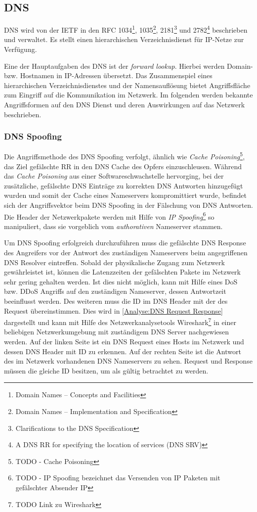 \subsection{\ac{DNS}}
\label{Analyse:DNS}
\ac{DNS} wird von der \ac{IETF} in den \ac{RFC} 1034\footnote{Domain Names – Concepts and Facilities}, 1035\footnote{Domain Names – Implementation and Specification}, 2181\footnote{Clarifications to the DNS Specification} und 2782\footnote{A DNS RR for specifying the location of services (DNS SRV)} beschrieben und verwaltet. Es stellt einen hierarchischen Verzeichnisdienst für \ac{IP}-Netze zur Verfügung. 

Eine der Hauptaufgaben des \ac{DNS} ist der \textit{forward lookup}. Hierbei werden Domain- bzw. Hostnamen in \ac{IP}-Adressen übersetzt. Das Zusammenspiel eines hierarchischen Verzeichnisdienstes und der Namensauflösung bietet Angriffsfläche zum Eingriff auf die Kommunikation im Netzwerk. Im folgenden werden bekannte Angriffsformen auf den \ac{DNS} Dienst und deren Auswirkungen auf das Netzwerk beschrieben.

\subsubsection{\ac{DNS} Spoofing}
Die Angriffsmethode des \ac{DNS} Spoofing verfolgt, ähnlich wie \textit{Cache Poisoning}\footnote{TODO - Cache Poisoning}, das Ziel gefälschte \ac{RR} in den \ac{DNS} Cache des Opfers einzuschleusen. Während das \textit{Cache Poisoning} aus einer Softwareschwachstelle hervorging, bei der zusätzliche, gefälschte \ac{DNS} Einträge zu korrekten \ac{DNS} Antworten hinzugefügt wurden und somit der Cache eines Nameservers kompromittiert wurde, befindet sich der Angriffsvektor beim \ac{DNS} Spoofing in der Fälschung von \ac{DNS} Antworten. Die Header der Netzwerkpakete werden mit Hilfe von \textit{IP Spoofing}\footnote{TODO - IP Spoofing bezeichnet das Versenden von IP Paketen mit gefälschter Absender IP} so manipuliert, dass sie vorgeblich vom \textit{authorativen} Nameserver stammen. 

Um \ac{DNS} Spoofing erfolgreich durchzuführen muss die gefälschte \ac{DNS} Response des Angreifers vor der Antwort des zuständigen Nameservers beim angegriffenen \ac{DNS} Resolver eintreffen. Sobald der physikalische Zugang zum Netzwerk gewährleistet ist, können die Latenzzeiten der gefälschten Pakete im Netzwerk sehr gering gehalten werden. Ist dies nicht möglich, kann mit Hilfe eines \ac{DoS} bzw. \ac{DDoS} Angriffs auf den zuständigen Nameserver, dessen Antwortzeit beeinflusst werden. Des weiteren muss die ID im \ac{DNS} Header mit der des Request übereinstimmen. Dies wird in \autoref{Analyse:DNS Request Response} dargestellt und kann mit Hilfe des Netzwerkanalysetools Wireshark\footnote{TODO Link zu Wireshark} in einer beliebigen Netzwerkumgebung mit zuständigem \ac{DNS} Server nachgewiesen werden. Auf der linken Seite ist ein DNS Request eines Hosts im Netzwerk und dessen \ac{DNS} Header mit ID zu erkennen. Auf der rechten Seite ist die Antwort des im Netzwerk vorhandenen \ac{DNS} Nameservers zu sehen. Request und Response müssen die gleiche ID besitzen, um als gültig betrachtet zu werden.

